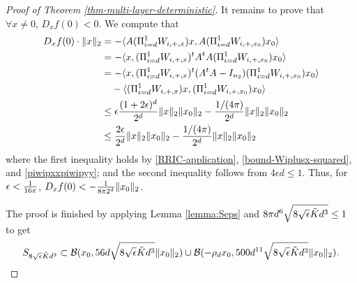 \documentclass[11pt]{article}
\newcommand{\eps}{\epsilon}
\newcommand{\zetacheck}{\rho}
\newcommand{\tran}{t}
\newcommand{\red}[1]{{\color{black} #1}}
\newcommand{\xo}{x_0}
\newcommand{\AtA}{A^\tran A}
\newcommand{\Boox}{B_{0, x}}
\newcommand{\PiWd}{\Pi_{i=d}^1 W_{i,+,x}}
\newcommand{\PiWdo}{\Pi_{i=d}^1 W_{i,+,\xo}}
\newcommand{\Ktilde}{\tilde{K}}
\begin{document}
\begin{proof}[Proof of Theorem \ref{thm-multi-layer-deterministic}]
It remains to prove that $\forall x \neq 0$,  $D_x f(0) < 0$.  
We compute that
\begin{align*}
D_x f(0) \cdot \red{\|x\|_2}&= -\langle A (\PiWd) x, A (\PiWdo) \xo \rangle \\
& = - \langle x, (\PiWd)^t \AtA (\PiWdo) \xo \rangle \\
& = - \langle x, (\PiWd)^t (\AtA - I_{n_2}) (\PiWdo) \xo \rangle \notag \\
& \quad - \langle (\PiWd) x,  (\PiWdo) \xo \rangle\\
& \leq \eps \frac{(1 + 2 \eps)^d}{2^d} \|x\|_2 \| \xo \|_2 - \frac{1/(4\pi)}{2^d} \| x\|_2 \| \xo\|_2 \\
& \leq  \frac{2 \eps}{2^d} \|x\|_2 \| \xo \|_2 - \frac{1/(4\pi)}{2^d} \| x\|_2 \| \xo\|_2 
\end{align*}
where the first inequality holds by \eqref{RRIC-application}, \eqref{bound-Wiplusx-squared}, and \eqref{piwipxxpiwipyy}; and the second inequality follows from $4 \eps d \leq 1$. Thus, for $\eps < \red{\frac{1}{16\pi}}$, $D_x f(0) < \red{-\frac{1}{8 \pi 2^d} \|\xo\|_2}$. 

The proof is finished by applying Lemma \ref{lemma:Seps} and $8 \pi d^6 \sqrt{\red{8} \sqrt{\eps} \Ktilde d^3} \leq 1$ to get 
\begin{align*}
S_{\red{8} \sqrt{\eps} \Ktilde d^3} \subset \mathcal{B}(x_0, 56 d \sqrt{\red{8} \sqrt{\eps} \Ktilde d^3} \|x_0\|_2  ) \cup  \mathcal{B}( -\zetacheck_d x_0, 500 d^{11} \sqrt{\red{8} \sqrt{\eps} \Ktilde d^3} \|\xo\|_2).
\end{align*}
\end{proof}







\end{document}
